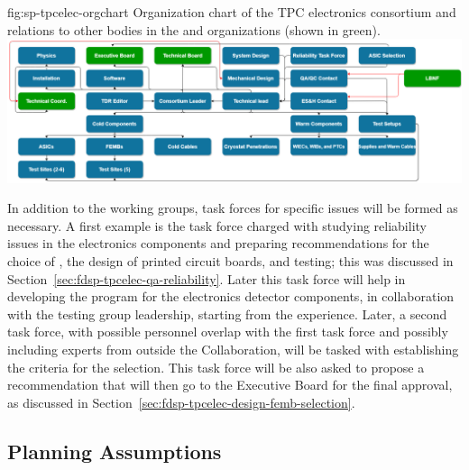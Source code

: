 \begin{dunefigure}
{fig:sp-tpcelec-orgchart}
{Organization chart of the TPC electronics consortium and relations to
other bodies in the  and  organizations (shown in green).}
\includegraphics[width=\linewidth]{sp-tpcelec-orgchart.png}
\end{dunefigure}


In addition to the working groups, task forces for specific issues 
will be formed as necessary. A first example is the task force
charged with studying reliability issues in the  electronics 
components and preparing recommendations for the choice of 
, the design of printed circuit boards, and testing; this
was discussed in Section~\ref{sec:fdsp-tpcelec-qa-reliability}. 
Later this task force will help in developing the  
program for the  electronics detector components, in collaboration
with the testing group leadership, starting from the  
experience. Later, a second task force, with possible
personnel overlap with the first task force and possibly including experts
from outside the  Collaboration, will be tasked with establishing the
criteria for the  selection. This task force will
be also asked to propose a recommendation that will then go to
the  Executive Board for the final approval, as discussed
in Section~\ref{sec:fdsp-tpcelec-design-femb-selection}.

\subsection{Planning Assumptions}
\label{sec:fdsp-tpcelec-management-planning}

